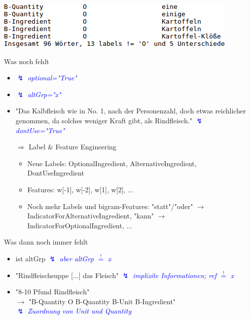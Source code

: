 \documentclass[12pt]{beamer}
\begin{document}
\begin{frame}
	\includegraphics[scale=0.9]{Images/crfPrototypUnterschiede}
\end{frame}

\begin{frame}{Was noch fehlt}
	\begin{itemize}
		\item \textcolor{blue}{$\lightning$ \textit{optional="True"}}
		
		\item \textcolor{blue}{$\lightning$ \textit{altGrp="x"}}
		
		\item "Das Kalbfleisch wie in No. 1, nach der Personenzahl, doch etwas reichlicher genommen, da solches weniger Kraft gibt, als Rindfleisch." \textcolor{blue}{$\lightning$ \large\textit{dontUse="True"}}
		
		\item[\Large$\Rightarrow$] Label \& Feature Engineering
		\begin{itemize}
			\item Neue Labels: OptionalIngredient, AlternativeIngredient, DontUseIngredient
			\item Features: w[-1], w[-2], w[1], w[2], ...
			\item Noch mehr Labels und bigram-Features: "statt"/"oder" $\rightarrow$ IndicatorForAlternativeIngredient, "kann" $\rightarrow$ IndicatorForOptionalIngredient, ... 
		\end{itemize}
	\end{itemize}
\end{frame}

\begin{frame}{Was dann noch immer fehlt}
	\begin{itemize}
		\item ist altGrp \textcolor{blue}{$\lightning$ \textit{aber altGrp $\overset{!}{=}$ x}}
		
		\item "Rindfleischsuppe [...] das Fleisch" \textcolor{blue}{$\lightning$ \textit{implizite Informationen; ref $\overset{!}{=}$ x}}
		
		\item "8-10 Pfund Rindfleisch"\\
		$\rightarrow$ "B-Quantity O B-Quantity B-Unit B-Ingredient"\\
		\textcolor{blue}{$\lightning$ \textit{Zuordnung von Unit und Quantity}}
	\end{itemize}
\end{frame}
\end{document}
